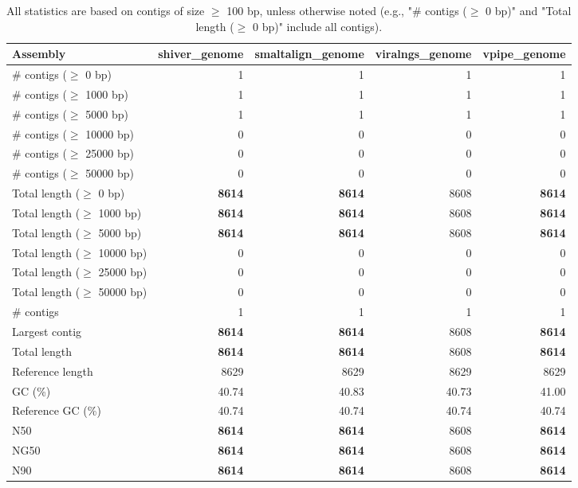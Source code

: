 \documentclass[12pt,a4paper]{article}
\begin{document}
\begin{table}[ht]
\begin{center}
\caption{All statistics are based on contigs of size $\geq$ 100 bp, unless otherwise noted (e.g., "\# contigs ($\geq$ 0 bp)" and "Total length ($\geq$ 0 bp)" include all contigs).}
\begin{tabular}{|l*{4}{|r}|}
\hline
Assembly & shiver\_genome & smaltalign\_genome & viralngs\_genome & vpipe\_genome \\ \hline
\# contigs ($\geq$ 0 bp) & 1 & 1 & 1 & 1 \\ \hline
\# contigs ($\geq$ 1000 bp) & 1 & 1 & 1 & 1 \\ \hline
\# contigs ($\geq$ 5000 bp) & 1 & 1 & 1 & 1 \\ \hline
\# contigs ($\geq$ 10000 bp) & 0 & 0 & 0 & 0 \\ \hline
\# contigs ($\geq$ 25000 bp) & 0 & 0 & 0 & 0 \\ \hline
\# contigs ($\geq$ 50000 bp) & 0 & 0 & 0 & 0 \\ \hline
Total length ($\geq$ 0 bp) & {\bf 8614} & {\bf 8614} & 8608 & {\bf 8614} \\ \hline
Total length ($\geq$ 1000 bp) & {\bf 8614} & {\bf 8614} & 8608 & {\bf 8614} \\ \hline
Total length ($\geq$ 5000 bp) & {\bf 8614} & {\bf 8614} & 8608 & {\bf 8614} \\ \hline
Total length ($\geq$ 10000 bp) & 0 & 0 & 0 & 0 \\ \hline
Total length ($\geq$ 25000 bp) & 0 & 0 & 0 & 0 \\ \hline
Total length ($\geq$ 50000 bp) & 0 & 0 & 0 & 0 \\ \hline
\# contigs & 1 & 1 & 1 & 1 \\ \hline
Largest contig & {\bf 8614} & {\bf 8614} & 8608 & {\bf 8614} \\ \hline
Total length & {\bf 8614} & {\bf 8614} & 8608 & {\bf 8614} \\ \hline
Reference length & 8629 & 8629 & 8629 & 8629 \\ \hline
GC (\%) & 40.74 & 40.83 & 40.73 & 41.00 \\ \hline
Reference GC (\%) & 40.74 & 40.74 & 40.74 & 40.74 \\ \hline
N50 & {\bf 8614} & {\bf 8614} & 8608 & {\bf 8614} \\ \hline
NG50 & {\bf 8614} & {\bf 8614} & 8608 & {\bf 8614} \\ \hline
N90 & {\bf 8614} & {\bf 8614} & 8608 & {\bf 8614} \\ \hline

\end{tabular}
\end{center}
\end{table}
\end{document}
